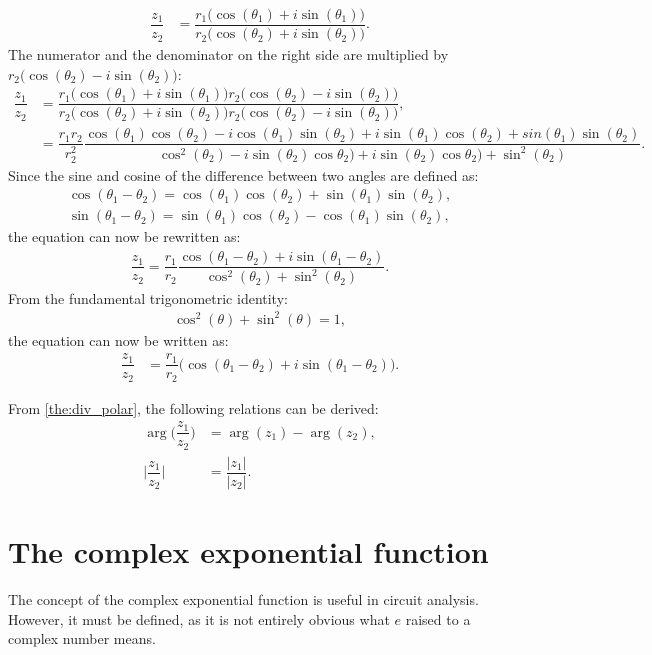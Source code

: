 \begin{prof}{}{}
\begin{align*}
\dfrac{z_1}{z_2}&=\dfrac{r_1\Big(\cos(\theta_1)+i\sin(\theta_1)\Big)}{r_2\Big(\cos(\theta_2)+i\sin(\theta_2)\Big)}.
\end{align*}
The numerator and the denominator on the right side are multiplied by $r_2\Big(\cos(\theta_2)-i\sin(\theta_2)\Big)$:
\begin{align*}
\dfrac{z_1}{z_2}&=\dfrac{r_1\Big(\cos(\theta_1)+i\sin(\theta_1)\Big)r_2\Big(\cos(\theta_2)-i\sin(\theta_2)\Big)}{r_2\Big(\cos(\theta_2)+i\sin(\theta_2)\Big)r_2\Big(\cos(\theta_2)-i\sin(\theta_2)\Big)},
\\
&=\dfrac{r_1 r_2}{r_2^2}  \dfrac{\cos(\theta_1)\cos(\theta_2)-i\cos(\theta_1)\sin(\theta_2)+i\sin(\theta_1)\cos(\theta_2)+sin(\theta_1)\sin(\theta_2)}{\cos^2(\theta_2)-i\sin(\theta_2)\cos\theta_2)+i\sin(\theta_2)\cos\theta_2)+\sin^2(\theta_2)}.
\end{align*}
Since the sine and cosine of the difference between two angles are defined as:
\begin{align*}
\cos(\theta_1-\theta_2)=\cos(\theta_1)\cos(\theta_2)+\sin(\theta_1)\sin(\theta_2),
\\
\sin(\theta_1-\theta_2)=\sin(\theta_1)\cos(\theta_2)-\cos(\theta_1)\sin(\theta_2),
\end{align*}
the equation can now be rewritten as:
\begin{align*}
\dfrac{z_1}{z_2}=\dfrac{r_1}{r_2}  \dfrac{\cos(\theta_1-\theta_2)+i\sin(\theta_1-\theta_2)}{\cos^2(\theta_2)+\sin^2(\theta_2)}.
\end{align*}
From the fundamental trigonometric identity: 
\begin{align*}
\cos^2(\theta)+\sin^2(\theta)=1,
\end{align*}
the equation can now be written as:
\begin{align*}
\dfrac{z_1}{z_2}&=\dfrac{r_1}{r_2}\Big( \cos(\theta_1-\theta_2)+ i \sin(\theta_1-\theta_2)\Big).
\end{align*}
\end{prof}
\noindent From \cref{the:div_polar}, the following relations can be derived:
\begin{align}
\arg\Big(\dfrac{z_1}{z_2}\Big)&=\arg(z_1)-\arg(z_2), \nonumber
\\
\Big|\dfrac{z_1}{z_2}\Big|&=\dfrac{|z_1|}{|z_2|}. \label{eq:mod_div}
\end{align}

\section{The complex exponential function}
The concept of the complex exponential function is useful in circuit analysis. However, it must be defined, as it is not entirely obvious what $e$ raised to a complex number means.

